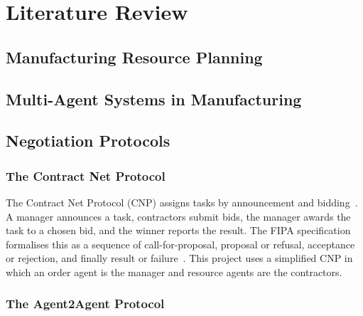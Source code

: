 \chapter{Literature Review}
\label{ch:literature}


\section{Manufacturing Resource Planning}


\section{Multi-Agent Systems in Manufacturing}


\section{Negotiation Protocols}

\subsection{The Contract Net Protocol}

The Contract Net Protocol (CNP) assigns tasks by announcement and
bidding~\cite{smith1980contractnet}. A manager announces a task, contractors
submit bids, the manager awards the task to a chosen bid, and the winner
reports the result. The FIPA specification formalises this as a sequence of
call-for-proposal, proposal or refusal, acceptance or rejection, and finally
result or failure~\cite{fipa2002contractnet}. This project uses a simplified
CNP in which an order agent is the manager and resource agents are the
contractors.


\subsection{The Agent2Agent Protocol}

